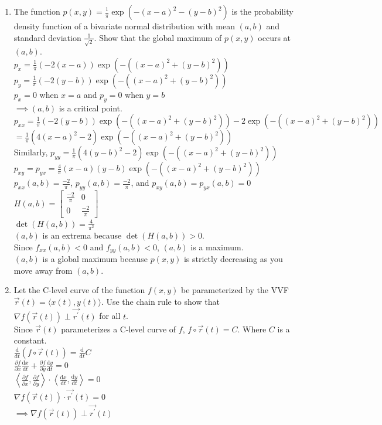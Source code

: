 \begin{enumerate}
	\item The function $p(x,y) = \frac{1}{\pi}\exp{\left(-(x-a)^2 - (y-b)^2\right)}$ is the probability density function of a bivariate normal distribution with mean $(a,b)$ and standard deviation $\frac{1}{\sqrt{2}}$. Show that the global maximum of $p(x,y)$ occurs at $(a,b)$.\\
	\indent
	$p_x = \frac{1}{\pi}(-2(x-a))\exp{(-((x-a)^2 + (y-b)^2))}$\\
	$p_y = \frac{1}{\pi}(-2(y-b))\exp{(-((x-a)^2 + (y-b)^2))}$\\
	$p_x = 0$ when $x=a$ and $p_y = 0$ when $y=b$\\
	$\implies (a,b)$ is a critical point.\\
	$p_{xx} = \frac{1}{\pi}(-2(y-b))\exp{(-((x-a)^2 + (y-b)^2))} - 2\exp{(-((x-a)^2 + (y-b)^2))}$\\
	$= \frac{1}{\pi}(4(x-a)^2 - 2)\exp{(-((x-a)^2 + (y-b)^2))}$\\
	Similarly, $p_{yy} = \frac{1}{\pi}(4(y-b)^2 - 2)\exp{(-((x-a)^2 + (y-b)^2))}$\\
	$p_{xy} = p_{yx} = \frac{4}{\pi}(x-a)(y-b)\exp{(-((x-a)^2 + (y-b)^2))}$\\
	$p_{xx}(a,b) = \frac{-2}{\pi}$, $p_{yy}(a,b) = \frac{-2}{\pi}$, and $p_{xy}(a,b) = p_{yx}(a,b) = 0$\\
	$H(a,b) = \begin{bmatrix}
		\frac{-2}{\pi} & 0 \\
		0 & \frac{-2}{\pi}
	\end{bmatrix}$\\
	$\det{(H(a,b))} = \frac{4}{\pi^2}$\\
	$(a,b)$ is an extrema because $\det{(H(a,b))} > 0$.\\
	Since $f_{xx}(a,b) < 0$ and $f_{yy}(a,b) < 0$, $(a,b)$ is a maximum.\\
	$(a,b)$ is a global maximum because $p(x,y)$ is strictly decreasing as you move away from $(a,b)$.\\
	
	\item Let the C-level curve of the function $f(x,y)$ be parameterized by the VVF $\vec{r}(t) = \langle x(t), y(t) \rangle$. Use the chain rule to show that $\nabla f(\vec{r}(t))\perp\vec{r^\prime}(t)$ for all $t$.\\
	\indent
	Since $\vec{r}(t)$ parameterizes a C-level curve of $f$, $f\circ\vec{r}(t) = C$. Where $C$ is a constant.\\
	$\frac{\mathrm{d}}{\mathrm{d}t}(f\circ\vec{r}(t)) = \frac{\mathrm{d}}{\mathrm{d}t}C$\\
	$\frac{\partial f}{\partial x}\frac{\mathrm{d}x}{\mathrm{d}t} + \frac{\partial f}{\partial y}\frac{\mathrm{d}y}{\mathrm{d}t} = 0$\\
	$\left<\frac{\partial f}{\partial x}, \frac{\partial f}{\partial y}\right> \cdot \left<\frac{\mathrm{d}x}{\mathrm{d}t}, \frac{\mathrm{d}y}{\mathrm{d}t}\right> = 0$\\
	$\nabla f(\vec{r}(t)) \cdot \vec{r^\prime}(t) = 0$\\
	$\implies \nabla f(\vec{r}(t))\perp\vec{r^\prime}(t)$\\
\end{enumerate}